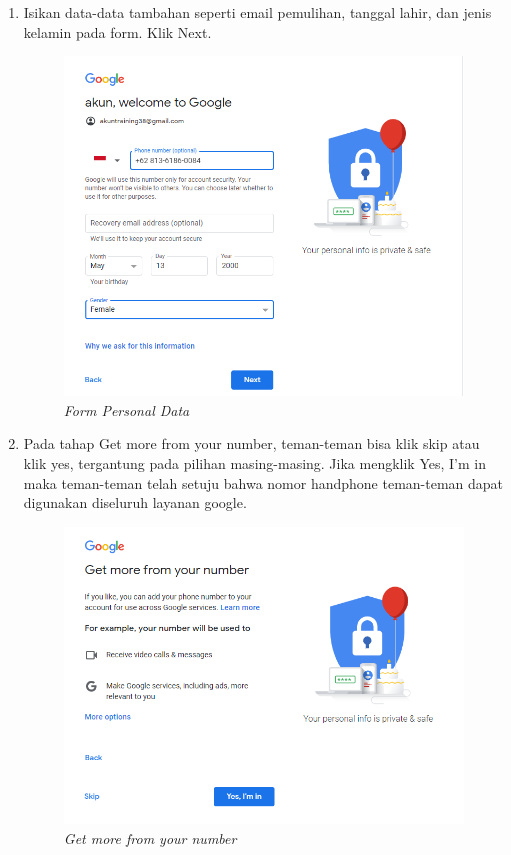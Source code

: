\begin{enumerate}
\item Isikan data-data tambahan seperti email pemulihan, tanggal lahir, dan jenis kelamin pada form. Klik Next.
\begin{figure}[H]
    \centering
    \includegraphics[scale=0.5]{figures/google5}
    \caption{\textit{Form Personal Data}}
    \label{google5}
\end{figure}

\item Pada tahap Get more from your number, teman-teman bisa klik skip atau klik yes, tergantung pada pilihan masing-masing. Jika mengklik Yes, I'm in maka teman-teman telah setuju bahwa nomor handphone teman-teman dapat digunakan diseluruh layanan google.
\begin{figure}[H]
    \centering
    \includegraphics[scale=0.5]{figures/google6}
    \caption{\textit{Get more from your number}}
    \label{google6}
\end{figure}


\end{enumerate}
